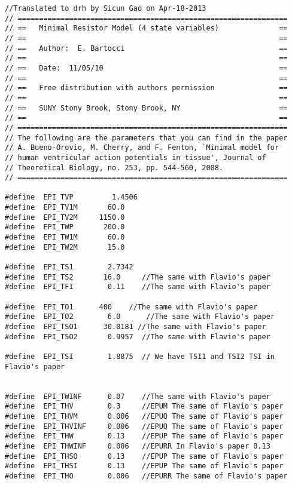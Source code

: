\begin{verbatim}
//Translated to drh by Sicun Gao on Apr-18-2013
// ===============================================================
// ==   Minimal Resistor Model (4 state variables)              ==
// ==                                                           ==
// ==   Author:  E. Bartocci                                    ==
// ==                                                           ==
// ==   Date:  11/05/10                                         ==
// ==                                                           ==
// ==   Free distribution with authors permission               ==
// ==                                                           ==
// ==   SUNY Stony Brook, Stony Brook, NY                       ==
// ==                                                           ==
// ===============================================================
// The following are the parameters that you can find in the paper
// A. Bueno-Orovio, M. Cherry, and F. Fenton, `Minimal model for
// human ventricular action potentials in tissue', Journal of
// Theoretical Biology, no. 253, pp. 544-560, 2008.
// ===============================================================

#define  EPI_TVP         1.4506
#define  EPI_TV1M       60.0
#define  EPI_TV2M     1150.0
#define  EPI_TWP       200.0
#define  EPI_TW1M       60.0
#define  EPI_TW2M       15.0

#define  EPI_TS1        2.7342
#define  EPI_TS2       16.0     //The same with Flavio's paper
#define  EPI_TFI        0.11    //The same with Flavio's paper

#define  EPI_TO1      400    //The same with Flavio's paper
#define  EPI_TO2        6.0      //The same with Flavio's paper
#define  EPI_TSO1      30.0181 //The same with Flavio's paper
#define  EPI_TSO2       0.9957  //The same with Flavio's paper

#define  EPI_TSI        1.8875  // We have TSI1 and TSI2 TSI in Flavio's paper


#define  EPI_TWINF      0.07    //The same with Flavio's paper
#define  EPI_THV        0.3     //EPUM The same of Flavio's paper
#define  EPI_THVM       0.006   //EPUQ The same of Flavio's paper
#define  EPI_THVINF     0.006   //EPUQ The same of Flavio's paper
#define  EPI_THW        0.13    //EPUP The same of Flavio's paper
#define  EPI_THWINF     0.006   //EPURR In Flavio's paper 0.13
#define  EPI_THSO       0.13    //EPUP The same of Flavio's paper
#define  EPI_THSI       0.13    //EPUP The same of Flavio's paper
#define  EPI_THO        0.006   //EPURR The same of Flavio's paper


\end{verbatim}
